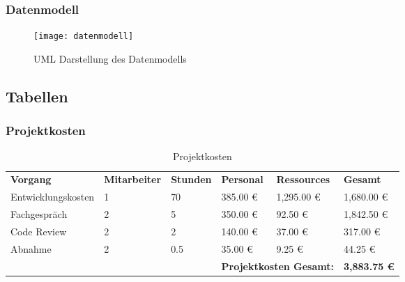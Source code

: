 \subsubsection{Datenmodell}
\begin{figure}[!htp]
    \caption{UML Darstellung des Datenmodells}
    \label{fig:datenmodell}
    \texttt{[image: datenmodell]}
    \centering
\end{figure}



\subsection{Tabellen}
\subsubsection{Projektkosten}
\begin{sidewaystable}
	\centering
	\caption{Projektkosten}
	\label{tabelle:projektkosten}
	\begin{tabular}{llllll}
		\rowcolor[HTML]{9698ED}
		{\color[HTML]{FFFFFF} \textbf{Vorgang}} & {\color[HTML]{FFFFFF} \textbf{Mitarbeiter}} & {\color[HTML]{FFFFFF} \textbf{Stunden}} & {\color[HTML]{FFFFFF} \textbf{Personal}} & {\color[HTML]{FFFFFF} \textbf{Ressources}} & {\color[HTML]{FFFFFF} \textbf{Gesamt}} \\
		Entwicklungskosten                      & 1                                           & 70                                      & 385.00 €                                 & 1,295.00 €                                 & 1,680.00 €                             \\
		\rowcolor[HTML]{BBDAFF}
		Fachgespräch                            & 2                                           & 5                                       & 350.00 €                                 & 92.50 €                                    & 1,842.50 €                             \\
		Code Review                             & 2                                           & 2                                       & 140.00 €                                 & 37.00 €                                    & 317.00 €                               \\
		\rowcolor[HTML]{BBDAFF}
		Abnahme                                 & 2                                           & 0.5                                     & 35.00 €                                  & 9.25 €                                     & 44.25 €                                \\
		&                                             &                                         & \multicolumn{2}{l}{\textbf{Projektkosten Gesamt:}}                                    & \textbf{3,883.75 €}
	\end{tabular}
\end{sidewaystable}


